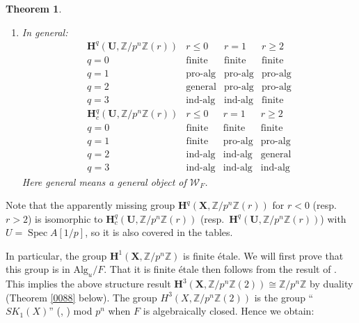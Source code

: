 \documentclass{amsart}
\newtheorem{Thm}{Theorem}[section]
\theoremstyle{remark}
\numberwithin{equation}{section}
\newcommand{\Z}{\mathbb{Z}}
\newcommand{\Alg}{\mathrm{Alg}}
\newcommand{\alg}[1]{\mathbf{#1}}
\DeclareMathOperator{\Spec}{Spec}
\begin{document}
\begin{Thm}
\begin{enumerate}
\[				\]
		\item
			In general:
				\[
					\begin{array}{c|ccc}
							\alg{H}^{q}(\alg{U}, \Z / p^{n} \Z(r))
						&
							r \le 0
						&
							r = 1
						&
							r \ge 2
						\\ \hline
							q = 0
						&
							\text{finite}
						&
							\text{finite}
						&
							\text{finite}
						\\
							q = 1
						&
							\text{pro-alg}
						&
							\text{pro-alg}
						&
							\text{pro-alg}
						\\
							q = 2
						&
							\text{general}
						&
							\text{pro-alg}
						&
							\text{pro-alg}
						\\
							q = 3
						&
							\text{ind-alg}
						&
							\text{ind-alg}
						&
							\text{finite}
					\end{array}
				\]
				\[
					\begin{array}{c|ccc}
							\alg{H}^{q}_{c}(\alg{U}, \Z / p^{n} \Z(r))
						&
							r \le 0
						&
							r = 1
						&
							r \ge 2
						\\ \hline
							q = 0
						&
							\text{finite}
						&
							\text{finite}
						&
							\text{finite}
						\\
							q = 1
						&
							\text{finite}
						&
							\text{pro-alg}
						&
							\text{pro-alg}
						\\
							q = 2
						&
							\text{ind-alg}
						&
							\text{ind-alg}
						&
							\text{general}
						\\
							q = 3
						&
							\text{ind-alg}
						&
							\text{ind-alg}
						&
							\text{ind-alg}
					\end{array}
				\]
			Here general means a general object of $\mathcal{W}_{F}$.
	\end{enumerate}
\end{Thm}

Note that the apparently missing group
$\alg{H}^{q}(\alg{X}, \Z / p^{n} \Z(r))$ for $r < 0$ (resp.\ $r > 2$) is isomorphic to
$\alg{H}^{q}_{c}(\alg{U}, \Z / p^{n} \Z(r))$
(resp.\ $\alg{H}^{q}(\alg{U}, \Z / p^{n} \Z(r))$)
with $U = \Spec A[1 / p]$,
so it is also covered in the tables.

In particular, the group $\alg{H}^{1}(\alg{X}, \Z / p^{n} \Z)$ is finite \'etale.
We will first prove that this group is in $\Alg_{u} / F$.
That it is finite \'etale then follows from the result of \cite{Suz23}.
This implies the above structure result $\alg{H}^{3}(\alg{X}, \Z / p^{n} \Z(2)) \cong \Z / p^{n} \Z$
by duality (Theorem \ref{0088} below).
The group $H^{3}(X, \Z / p^{n} \Z(2))$ is the group ``$SK_{1}(X)$''
(\cite{Blo81}, \cite{Sai86}) mod $p^{n}$ when $F$ is algebraically closed.
Hence we obtain:
\end{document}
